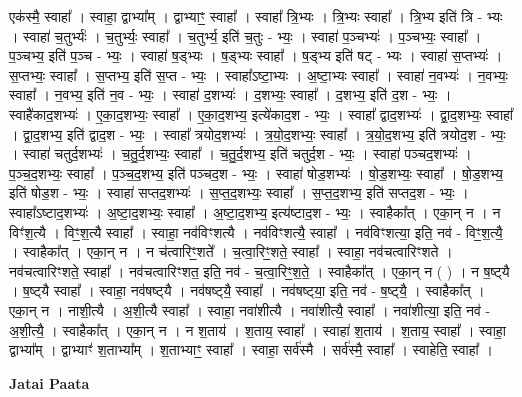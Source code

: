 \documentclass[17pt]{extarticle}
\begin{document}
एक॑स्मै॒ स्वाहा᳚ । स्वाहा॒ द्वाभ्या᳚म् । द्वाभ्याꣳ॒॒ स्वाहा᳚ । स्वाहा᳚ त्रि॒भ्यः । त्रि॒भ्यः स्वाहा᳚ । त्रि॒भ्य इति॑ त्रि - भ्यः । स्वाहा॑ च॒तुर्भ्यः॑ । च॒तुर्भ्यः॒ स्वाहा᳚ । च॒तुर्भ्य॒ इति॑ च॒तुः - भ्यः॒ । स्वाहा॑ प॒ञ्चभ्यः॑ । प॒ञ्चभ्यः॒ स्वाहा᳚ । प॒ञ्चभ्य॒ इति॑ प॒ञ्च - भ्यः॒ । स्वाहा॑ ष॒ड्भ्यः । ष॒ड्भ्यः स्वाहा᳚ । ष॒ड्भ्य इति॑ षट् - भ्यः । 
स्वाहा॑ स॒प्तभ्यः॑ । स॒प्तभ्यः॒ स्वाहा᳚ । स॒प्तभ्य॒ इति॑ स॒प्त - भ्यः॒ । स्वाहा᳚ऽष्टा॒भ्यः । अ॒ष्टा॒भ्यः स्वाहा᳚ । स्वाहा॑ न॒वभ्यः॑ । न॒वभ्यः॒ स्वाहा᳚ । न॒वभ्य॒ इति॑ न॒व - भ्यः॒ । स्वाहा॑ द॒शभ्यः॑ । द॒शभ्यः॒ स्वाहा᳚ । द॒शभ्य॒ इति॑ द॒श - भ्यः॒ । स्वाहै॑काद॒शभ्यः॑ । ए॒का॒द॒शभ्यः॒ स्वाहा᳚ । ए॒का॒द॒शभ्य॒ इत्ये॑काद॒श - भ्यः॒ । स्वाहा᳚ द्वाद॒शभ्यः॑ । द्वा॒द॒शभ्यः॒ स्वाहा᳚ । द्वा॒द॒शभ्य॒ इति॑ द्वाद॒श - भ्यः॒ । स्वाहा᳚ त्रयोद॒शभ्यः॑ । त्र॒यो॒द॒शभ्यः॒ स्वाहा᳚ । त्र॒यो॒द॒शभ्य॒ इति॑ त्रयोद॒श - भ्यः॒ । स्वाहा॑ चतुर्द॒शभ्यः॑ । च॒तु॒र्द॒शभ्यः॒ स्वाहा᳚ । च॒तु॒र्द॒शभ्य॒ इति॑ चतुर्द॒श - भ्यः॒ । स्वाहा॑ पञ्चद॒शभ्यः॑ । प॒ञ्च॒द॒शभ्यः॒ स्वाहा᳚ । प॒ञ्च॒द॒शभ्य॒ इति॑ पञ्चद॒श - भ्यः॒ । स्वाहा॑ षोड॒शभ्यः॑ । षो॒ड॒शभ्यः॒ स्वाहा᳚ । षो॒ड॒शभ्य॒ इति॑ षोड॒श - भ्यः॒ । स्वाहा॑ सप्तद॒शभ्यः॑ । स॒प्त॒द॒शभ्यः॒ स्वाहा᳚ । स॒प्त॒द॒शभ्य॒ इति॑ सप्तद॒श - भ्यः॒ । स्वाहा᳚ऽष्टाद॒शभ्यः॑ । अ॒ष्टा॒द॒शभ्यः॒ स्वाहा᳚ । अ॒ष्टा॒द॒शभ्य॒ इत्य॑ष्टाद॒श - भ्यः॒ । स्वाहैका᳚त् । एका॒न् न । न विꣳ॑श॒त्यै । विꣳ॒॒श॒त्यै स्वाहा᳚ । स्वाहा॒ नव॑विꣳशत्यै । नव॑विꣳशत्यै॒ स्वाहा᳚ । नव॑विꣳशत्या॒ इति॒ नव॑ - विꣳ॒॒श॒त्यै॒ । स्वाहैका᳚त् । एका॒न् न । न च॑त्वारिꣳ॒॒शते᳚ । च॒त्वा॒रिꣳ॒॒शते॒ स्वाहा᳚ । स्वाहा॒ नव॑चत्वारिꣳशते । नव॑चत्वारिꣳशते॒ स्वाहा᳚ । नव॑चत्वारिꣳशत॒ इति॒ नव॑ - च॒त्वा॒रिꣳ॒॒श॒ते॒ । स्वाहैका᳚त् । एका॒न् न ( ) । न ष॒ष्ट्‍यै । ष॒ष्ट्‍यै स्वाहा᳚ । स्वाहा॒ नव॑षष्ट्‍यै । नव॑षष्ट्‍यै॒ स्वाहा᳚ । नव॑षष्ट्‍या॒ इति॒ नव॑ - ष॒ष्ट्‍यै॒ । स्वाहैका᳚त् । एका॒न् न । नाशी॒त्यै । अ॒शी॒त्यै स्वाहा᳚ । स्वाहा॒ नवा॑शीत्यै । नवा॑शीत्यै॒ स्वाहा᳚ । नवा॑शीत्या॒ इति॒ नव॑ - अ॒शी॒त्यै॒ । स्वाहैका᳚त् । एका॒न् न । न श॒ताय॑ । श॒ताय॒ स्वाहा᳚ । स्वाहा॑ श॒ताय॑ । श॒ताय॒ स्वाहा᳚ । स्वाहा॒ द्वाभ्या᳚म् । द्वाभ्याꣳ॑ श॒ताभ्या᳚म् । श॒ताभ्याꣳ॒॒ स्वाहा᳚ । स्वाहा॒ सर्व॑स्मै । सर्व॑स्मै॒ स्वाहा᳚ । स्वाहेति॒ स्वाहा᳚ । \newline

\textbf{Jatai Paata} \newline
\end{document}
